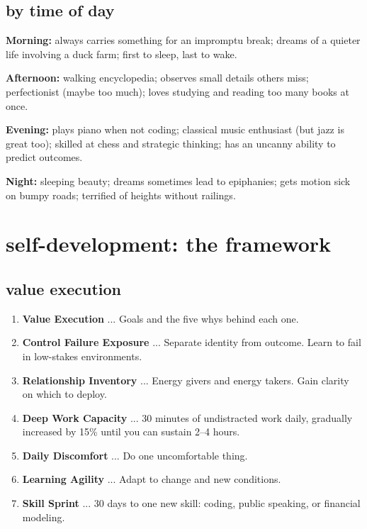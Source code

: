 \documentclass[12pt, letterpaper]{article}
\begin{document}
\subsection{by time of day}

\textbf{Morning:} always carries something for an impromptu break; dreams of a quieter life involving a duck farm; first to sleep, last to wake.

\textbf{Afternoon:} walking encyclopedia; observes small details others miss; perfectionist (maybe too much); loves studying and reading too many books at once.

\textbf{Evening:} plays piano when not coding; classical music enthusiast (but jazz is great too); skilled at chess and strategic thinking; has an uncanny ability to predict outcomes.

\textbf{Night:} sleeping beauty; dreams sometimes lead to epiphanies; gets motion sick on bumpy roads; terrified of heights without railings.

\section{self-development: the framework}

\subsection{value execution}
\begin{enumerate}[leftmargin=*, label=\arabic*.]
  \item \textbf{Value Execution} ... Goals and the five whys behind each one.
  \item \textbf{Control Failure Exposure} ... Separate identity from outcome. Learn to fail in low-stakes environments.
  \item \textbf{Relationship Inventory} ... Energy givers and energy takers. Gain clarity on which to deploy.
  \item \textbf{Deep Work Capacity} ... 30 minutes of undistracted work daily, gradually increased by 15\% until you can sustain 2--4 hours.
  \item \textbf{Daily Discomfort} ... Do one uncomfortable thing.
  \item \textbf{Learning Agility} ... Adapt to change and new conditions.
  \item \textbf{Skill Sprint} ... 30 days to one new skill: coding, public speaking, or financial modeling.
\end{enumerate}
\end{document}
